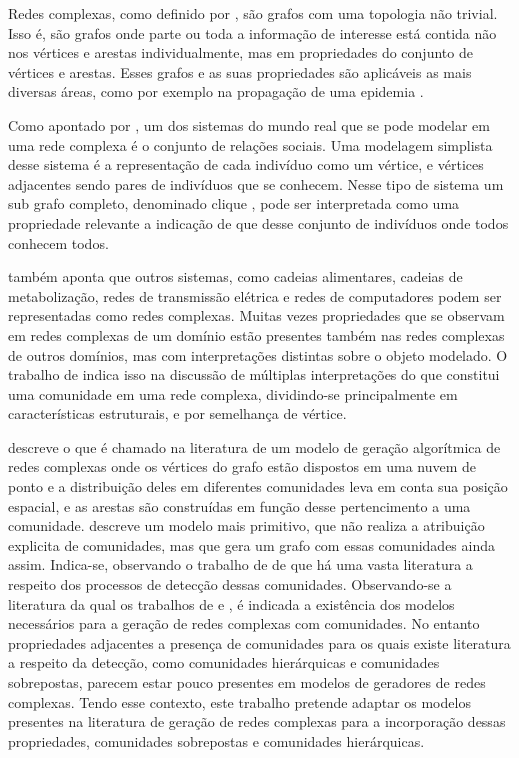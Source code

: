 \documentclass[notes.tex]{subfiles}
\begin{document}
Redes complexas, como definido por , são grafos com uma topologia não trivial.
Isso é, são grafos onde parte ou toda a informação de interesse está contida não nos vértices e arestas individualmente, mas em propriedades do conjunto de vértices e arestas.
Esses grafos e as suas propriedades são aplicáveis as mais diversas áreas, como por exemplo na propagação de uma epidemia .

Como apontado por , um dos sistemas do mundo real que se pode modelar em uma rede complexa é o conjunto de relações sociais.
Uma modelagem simplista desse sistema é a representação de cada indivíduo como um vértice, e vértices adjacentes sendo pares de indivíduos que se conhecem.
Nesse tipo de sistema um sub grafo completo, denominado clique \cite{fortunato2010community}, pode ser interpretada como uma propriedade relevante a indicação de que desse conjunto de indivíduos onde todos conhecem todos.

 também aponta que outros sistemas, como cadeias alimentares, cadeias de metabolização, redes de transmissão elétrica e redes de computadores podem ser representadas como redes complexas.
Muitas vezes propriedades que se observam em redes complexas de um domínio estão presentes também nas redes complexas de outros domínios, mas com interpretações distintas sobre o objeto modelado.
O trabalho de  indica isso na discussão de múltiplas interpretações do que constitui uma comunidade em uma rede complexa, dividindo-se principalmente em características estruturais, e por semelhança de vértice.

 descreve o que é chamado na literatura de um modelo de geração algorítmica de redes complexas onde os vértices do grafo estão dispostos em uma nuvem de ponto e a distribuição deles em diferentes comunidades leva em conta sua posição espacial, e as arestas são construídas em função desse pertencimento a uma comunidade.
 descreve um modelo mais primitivo, que não realiza a atribuição explicita de comunidades, mas que gera um grafo com essas comunidades ainda assim. 
Indica-se, observando o trabalho de  de que há uma vasta literatura a respeito dos processos de detecção dessas comunidades.
Observando-se a literatura da qual os trabalhos de  e , é indicada a existência dos modelos necessários para a geração de redes complexas com comunidades.
No entanto propriedades adjacentes a presença de comunidades para os quais existe literatura a respeito da detecção, como comunidades hierárquicas e comunidades sobrepostas, parecem estar pouco presentes em modelos de geradores de redes complexas.
Tendo esse contexto, este trabalho pretende adaptar os modelos presentes na literatura de geração de redes complexas para a incorporação dessas propriedades, comunidades sobrepostas e comunidades hierárquicas.
\end{document}
